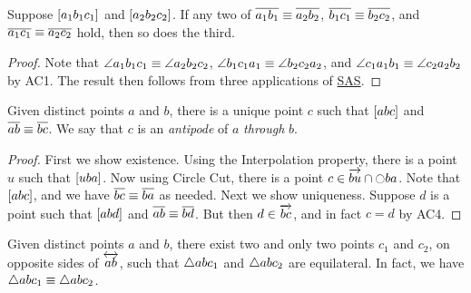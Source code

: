 \begin{cor}\label{cor:segment-addition}
Suppose \([ a_1 b_1 c_1 ]\) and \([ a_2 b_2 c_2 ]\).
If any two of \(\overline{a_1b_1} \equiv \overline{a_2b_2}\), \(\overline{b_1c_1} \equiv \overline{b_2c_2}\), and \(\overline{a_1c_1} \equiv \overline{a_2c_2}\) hold, then so does the third.
\end{cor}

\begin{proof}
Note that \(\angle{a_1b_1c_1} \equiv \angle{a_2b_2c_2}\), \(\angle{b_1c_1a_1} \equiv \angle{b_2c_2a_2}\), and \(\angle{c_1a_1b_1} \equiv \angle{c_2a_2b_2}\) by AC1.
The result then follows from three applications of \hyperref[prop:sas-theorem]{SAS}.
\end{proof}

\begin{construct}[Antipode]\label{construct:antipode}
Given distinct points \(a\) and \(b\), there is a unique point \(c\) such that \([ a b c ]\) and \(\overline{ab} \equiv \overline{bc}\).
We say that \(c\) is an \emph{antipode} of \(a\) \emph{through} \(b\).
\end{construct}

\begin{proof}
First we show existence.
Using the Interpolation property, there is a point \(u\) such that \([ u b a ]\).
Now using Circle Cut, there is a point \(c \in \overrightarrow{bu} \cap \ocircle{ba}\).
Note that \([ a b c ]\), and we have \(\overline{bc} \equiv \overline{ba}\) as needed.
Next we show uniqueness.
Suppose \(d\) is a point such that \([ a b d ]\) and \(\overline{ab} \equiv \overline{bd}\).
But then \(d \in \overrightarrow{bc}\), and in fact \(c = d\) by AC4.
\end{proof}

\begin{construct}\label{construct:equilateral-points}
Given distinct points \(a\) and \(b\), there exist two and only two points \(c_1\) and \(c_2\), on opposite sides of \(\overleftrightarrow{ab}\), such that \(\bigtriangleup{abc_1}\) and \(\bigtriangleup{abc_2}\) are equilateral.
In fact, we have \(\bigtriangleup{abc_1} \equiv \bigtriangleup{abc_2}\).
\end{construct}


